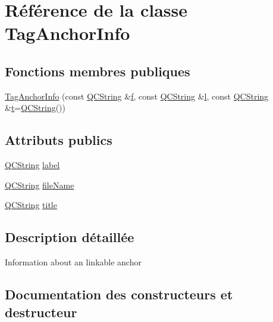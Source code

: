 \hypertarget{class_tag_anchor_info}{}\section{Référence de la classe Tag\+Anchor\+Info}
\label{class_tag_anchor_info}
\subsection*{Fonctions membres publiques}
\begin{DoxyCompactItemize}
\item 
\hyperlink{class_tag_anchor_info_aba42283529253b4f739e411b335ee156}{Tag\+Anchor\+Info} (const \hyperlink{class_q_c_string}{Q\+C\+String} \&\hyperlink{060__command__switch_8tcl_af6830d2c644b45088ea8f1f74a46b778}{f}, const \hyperlink{class_q_c_string}{Q\+C\+String} \&\hyperlink{060__command__switch_8tcl_aff56f84b49947b84b2a304f51cf8e678}{l}, const \hyperlink{class_q_c_string}{Q\+C\+String} \&\hyperlink{058__bracket__recursion_8tcl_a69e959f6901827e4d8271aeaa5fba0fc}{t}=\hyperlink{class_q_c_string}{Q\+C\+String}())
\end{DoxyCompactItemize}
\subsection*{Attributs publics}
\begin{DoxyCompactItemize}
\item 
\hyperlink{class_q_c_string}{Q\+C\+String} \hyperlink{class_tag_anchor_info_af21f6c7bc90c6e891896f4f9729903a0}{label}
\item 
\hyperlink{class_q_c_string}{Q\+C\+String} \hyperlink{class_tag_anchor_info_a1a74ea88349151a92b1016917f1a0861}{file\+Name}
\item 
\hyperlink{class_q_c_string}{Q\+C\+String} \hyperlink{class_tag_anchor_info_a62f01240651361a71edb6e18d65c2c87}{title}
\end{DoxyCompactItemize}


\subsection{Description détaillée}
Information about an linkable anchor 

\subsection{Documentation des constructeurs et destructeur}
\hypertarget{class_tag_anchor_info_aba42283529253b4f739e411b335ee156}{}
